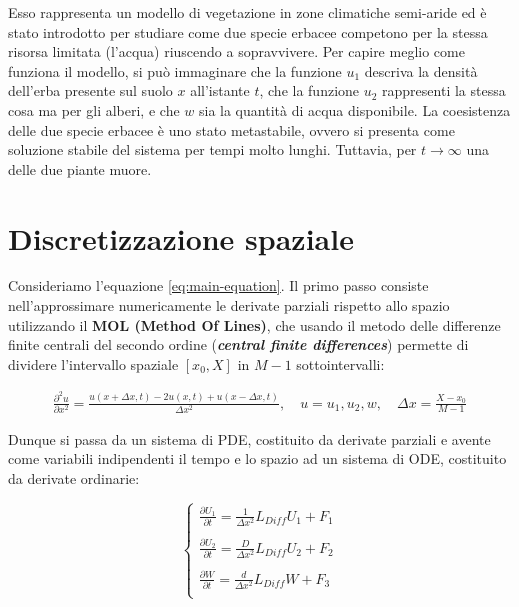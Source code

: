 \noindent Esso rappresenta un modello di vegetazione in zone climatiche semi-aride ed è stato introdotto per studiare come due specie erbacee competono per la stessa risorsa limitata (l'acqua) riuscendo a sopravvivere. Per capire meglio come funziona il modello, si può immaginare che la funzione $u_1$ descriva la densità dell'erba presente sul suolo $x$ all'istante $t$, che la funzione $u_2$ rappresenti la stessa cosa ma per gli alberi, e che $w$ sia la quantità di acqua disponibile. La coesistenza delle due specie erbacee è uno stato metastabile, ovvero si presenta come soluzione stabile del sistema per tempi molto lunghi. Tuttavia, per $t \to \infty$ una delle due piante muore.

\section{Discretizzazione spaziale} \label{sec:space-semi-discretization}
\noindent Consideriamo l'equazione \eqref{eq:main-equation}. Il primo passo consiste nell'approssimare numericamente le derivate parziali rispetto allo spazio utilizzando il \textbf{MOL (Method Of Lines)}, che usando il metodo delle differenze finite centrali del secondo ordine (\textit{\textbf{central finite differences}}) permette di dividere l'intervallo spaziale $[x_0, X]$ in $M - 1$ sottointervalli:

\vspace{.5cm}

\begin{align*}
    \displaystyle
    \frac{\partial^2 u}{\partial x^2} = \frac{u(x + \Delta x,t) - 2u(x,t) + u(x - \Delta x,t)}{\Delta x^2}, \quad u = u_1, u_2, w, \quad \Delta x = \frac{X - x_0}{M - 1}
\end{align*}

\vspace{.5cm}

\noindent Dunque si passa da un sistema di PDE, costituito da derivate parziali e avente come variabili indipendenti il tempo e lo spazio ad un sistema di ODE, costituito da derivate ordinarie:

\begin{equation}
    \begin{cases}
        \displaystyle
        \frac{\partial U_1}{\partial t} = \frac{1}{\Delta x^2} L_{Diff}U_1 + F_1 \\\\
        \displaystyle
        \frac{\partial U_2}{\partial t} = \frac{D}{\Delta x^2} L_{Diff}U_2 + F_2 \\\\
        \displaystyle
        \frac{\partial W}{\partial t} = \frac{d}{\Delta x^2} L_{Diff}W + F_3 \\
    \end{cases}
    \label{eq:ODE-system}
\end{equation}


